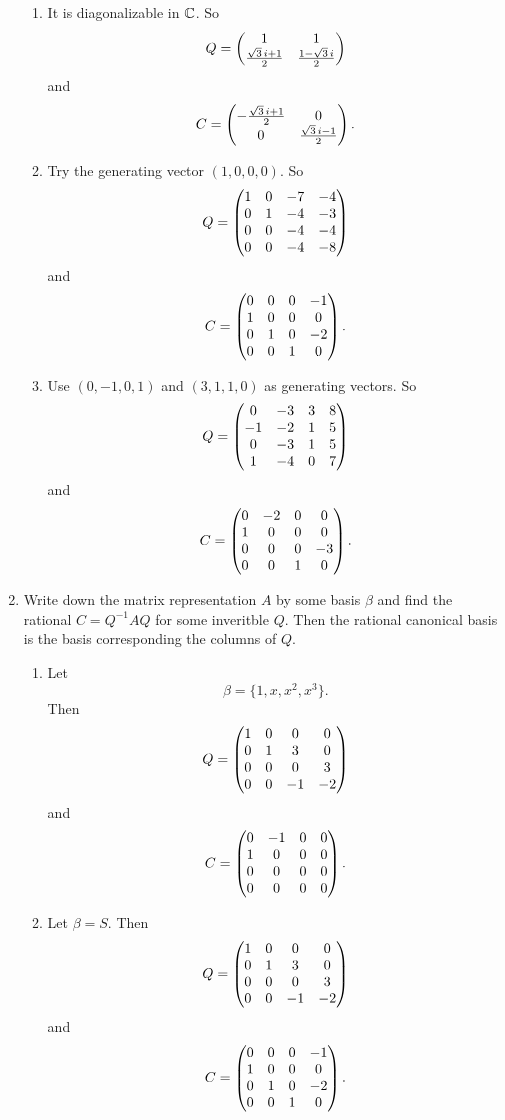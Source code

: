 \begin{enumerate}
\begin{enumerate}
\item It is diagonalizable in $\mathbb{C}$. So 
\[Q=\begin{pmatrix}1 & 1\cr \frac{\sqrt{3}\,i+1}{2} & \frac{1-\sqrt{3}\,i}{2}\end{pmatrix}\]
and 
\[C=\begin{pmatrix}-\frac{\sqrt{3}\,i+1}{2} & 0\cr 0 & \frac{\sqrt{3}\,i-1}{2}\end{pmatrix}.\]
\item Try the generating vector $(1,0,0,0)$. So 
\[Q=\begin{pmatrix}1 & 0 & -7 & -4\cr 0 & 1 & -4 & -3\cr 0 & 0 & -4 & -4\cr 0 & 0 & -4 & -8\end{pmatrix}\]
and 
\[C=\begin{pmatrix}0 & 0 & 0 & -1\cr 1 & 0 & 0 & 0\cr 0 & 1 & 0 & -2\cr 0 & 0 & 1 & 0\end{pmatrix}.\]
\item Use $(0,-1,0,1)$ and $(3,1,1,0)$ as generating vectors. So
\[Q=\begin{pmatrix}0 & -3 & 3 & 8\cr -1 & -2 & 1 & 5\cr 0 & -3 & 1 & 5\cr 1 & -4 & 0 & 7\end{pmatrix}\]
and 
\[C=\begin{pmatrix}0 & -2 & 0 & 0\cr 1 & 0 & 0 & 0\cr 0 & 0 & 0 & -3\cr 0 & 0 & 1 & 0\end{pmatrix}.\]
\end{enumerate}
\item Write down the matrix representation $A$ by some basis $\beta$ and find the rational $C=Q^{-1}AQ$ for some inveritble $Q$. Then the rational canonical basis is the basis corresponding the columns of $Q$.\begin{enumerate}
\item Let 
\[\beta=\{1,x,x^2,x^3\}.\]
Then 
\[Q=\begin{pmatrix}1 & 0 & 0 & 0\cr 0 & 1 & 3 & 0\cr 0 & 0 & 0 & 3\cr 0 & 0 & -1 & -2\end{pmatrix}\]
and 
\[C=\begin{pmatrix}0 & -1 & 0 & 0\cr 1 & 0 & 0 & 0\cr 0 & 0 & 0 & 0\cr 0 & 0 & 0 & 0\end{pmatrix}.\]
\item Let $\beta=S$. Then 
\[Q=\begin{pmatrix}1 & 0 & 0 & 0\cr 0 & 1 & 3 & 0\cr 0 & 0 & 0 & 3\cr 0 & 0 & -1 & -2\end{pmatrix}\]
and 
\[C=\begin{pmatrix}0 & 0 & 0 & -1\cr 1 & 0 & 0 & 0\cr 0 & 1 & 0 & -2\cr 0 & 0 & 1 & 0\end{pmatrix}.\]

\end{enumerate}
\end{enumerate}
